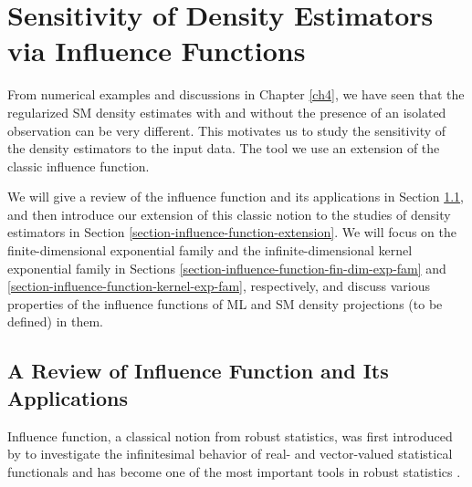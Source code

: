 \chapter{Sensitivity of Density Estimators via Influence Functions}
\label{ch5}


From numerical examples and discussions in Chapter \ref{ch4}, we have seen that the regularized SM density estimates with and without the presence of an isolated observation can be very different. This motivates us to study the sensitivity of the density estimators to the input data. The tool we use an extension of the classic influence function. 

We will give a review of the influence function and its applications in Section \ref{section-influence-function-review}, and then introduce our extension of this classic notion to the studies of density estimators in Section \ref{section-influence-function-extension}. We will focus on the finite-dimensional exponential family and the infinite-dimensional kernel exponential family in Sections \ref{section-influence-function-fin-dim-exp-fam} and \ref{section-influence-function-kernel-exp-fam}, respectively, and discuss various properties of the influence functions of ML and SM density projections (to be defined) in them. 

\section{A Review of Influence Function and Its Applications}\label{section-influence-function-review}

Influence function, a classical notion from robust statistics, was first introduced by \textcite{Hampel1968-gm} to investigate the infinitesimal behavior of real- and vector-valued statistical functionals and has become one of the most important tools in robust statistics \parencite{Hampel1986-ig}. 

